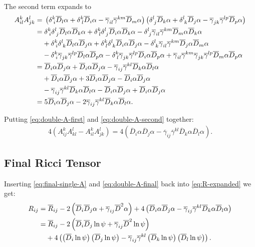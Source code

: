 \documentclass[aps,prd,preprint]{revtex4-1}
\newcommand{\ogamma}{\overline{\gamma}}
\newcommand{\OD}{\overline{D}}
\begin{document}
The second term expands to
\begin{align}
A^k_{il} A^l_{jk} = & \;
  \left( \delta^k_{\; i} \OD_l \alpha + \delta^k_{\; l} \OD_i \alpha - \ogamma_{il} \ogamma^{km} \OD_m \alpha \right)
  \left( \delta^l_{\; j} \OD_k \alpha + \delta^l_{\; k} \OD_j \alpha - \ogamma_{jk} \ogamma^{lp} \OD_p \alpha \right) \\
= & \; \delta^k_{\; i} \delta^l_{\; j} \OD_l \alpha \OD_k \alpha + \delta^k_{\; l} \delta^l_{\; j} \OD_i \alpha \OD_k \alpha -
  \delta^l_{\; j} \ogamma_{il} \ogamma^{km} \OD_m \alpha \OD_k \alpha \notag \\
& + \delta^k_{\; i} \delta^l_{\; k} \OD_l \alpha \OD_j \alpha + \delta^k_{\; l} \delta^l_{\; k} \OD_i \alpha \OD_j \alpha -
  \delta^l_{\; k} \ogamma_{il} \ogamma^{km} \OD_j \alpha \OD_m \alpha \notag \\
& -\delta^k_{\; i} \ogamma_{jk} \ogamma^{lp} \OD_l \alpha \OD_p \alpha -
  \delta^k_{\; l} \ogamma_{jk} \ogamma^{lp} \OD_i \alpha \OD_p \alpha +
  \ogamma_{il} \ogamma^{km} \ogamma_{jk} \ogamma^{lp} \OD_m \alpha \OD_p \alpha \\
= & \; \OD_i \alpha \OD_j \alpha + \OD_i \alpha \OD_j \alpha - \ogamma_{ij} \ogamma^{kl} \OD_k \alpha \OD_l \alpha
  \notag \\
& + \OD_i \alpha \OD_j \alpha + 3 \OD_i \alpha \OD_j \alpha - \OD_i \alpha \OD_j \alpha \notag \\
& - \ogamma_{ij} \ogamma^{kl} \OD_k \alpha \OD_l \alpha - \OD_i \alpha \OD_j \alpha + \OD_i \alpha \OD_j \alpha \\
= & \; 5 \OD_i \alpha \OD_j \alpha - 2 \ogamma_{ij} \ogamma^{kl} \OD_k \alpha \OD_l \alpha.
\label{eq:double-A-second}
\end{align}

Putting \eqref{eq:double-A-first} and \eqref{eq:double-A-second} together:
\begin{align}
4 \left( A^k_{ij} A^l_{kl} - A^k_{il} A^l_{jk} \right) = 4 \left(
  \OD_i \alpha \OD_j \alpha - \ogamma_{ij} \ogamma^{kl} \OD_k \alpha \OD_l \alpha \right). \label{eq:double-A-final}
\end{align}

\subsection{Final Ricci Tensor}

Inserting \eqref{eq:final-single-A} and \eqref{eq:double-A-final} back into \eqref{eq:R-expanded} we get:
\begin{align}
R_{ij} = & \; \overline{R}_{ij} -2 \left( \OD_i \OD_j \alpha + \ogamma_{ij} \OD^2 \alpha \right) + 4 \left(
  \OD_i \alpha \OD_j \alpha - \ogamma_{ij} \ogamma^{kl} \OD_k \alpha \OD_l \alpha \right) \\
= & \; \overline{R}_{ij} -2 \left( \OD_i \OD_j \ln \psi + \ogamma_{ij} \OD^2 \ln \psi \right) \notag \\
  & + 4 \left(
  \left( \OD_i \ln \psi \right) \left( \OD_j \ln \psi \right) - \ogamma_{ij} \ogamma^{kl} \left( \OD_k \ln \psi \right)
  \left( \OD_l \ln \psi \right) \right).
\end{align}
\end{document}
